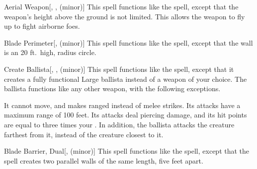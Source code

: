 \lowercase{\hypertarget{spell:Aerial Weapon}{}}\label{spell:Aerial Weapon}
\begin{freeability}[\nth{2}]{\hypertarget{spell:Aerial Weapon}{Aerial Weapon}}[, ,  (minor)]
This spell functions like the  spell, except that the weapon's height above the ground is not limited.
This allows the weapon to fly up to fight airborne foes.
\end{freeability}
\vspace{0.25em}



\lowercase{\hypertarget{spell:Blade Perimeter}{}}\label{spell:Blade Perimeter}
\begin{freeability}[\nth{2}]{\hypertarget{spell:Blade Perimeter}{Blade Perimeter}}[,  (minor)]
This spell functions like the  spell, except that the wall is an 20 ft.\ high, \areamed radius circle.
\end{freeability}
\vspace{0.25em}



\lowercase{\hypertarget{spell:Create Ballista}{}}\label{spell:Create Ballista}
\begin{freeability}[\nth{2}]{\hypertarget{spell:Create Ballista}{Create Ballista}}[, ,  (minor)]
This spell functions like the  spell, except that it creates a fully functional Large ballista instead of a weapon of your choice.
The ballista functions like any other weapon, with the following exceptions.

It cannot move, and makes ranged  instead of melee strikes.
Its attacks have a maximum range of 100 feet.
Its attacks deal piercing damage, and its hit points are equal to three times your .
In addition, the ballista attacks the creature farthest from it, instead of the creature closest to it.
\end{freeability}
\vspace{0.25em}



\lowercase{\hypertarget{spell:Blade Barrier, Dual}{}}\label{spell:Blade Barrier, Dual}
\begin{freeability}[\nth{3}]{\hypertarget{spell:Blade Barrier, Dual}{Blade Barrier, Dual}}[,  (minor)]
This spell functions like the  spell, except that the spell creates two parallel walls of the same length, five feet apart.
\end{freeability}
\vspace{0.25em}




